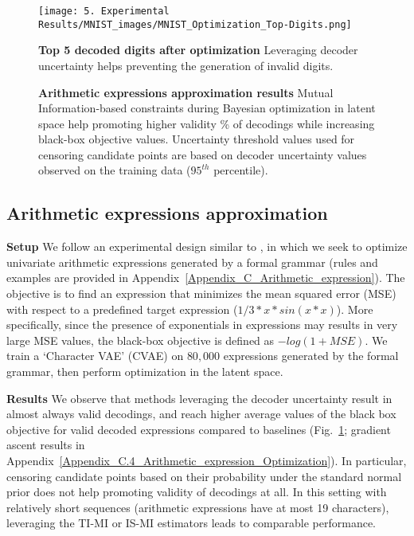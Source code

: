 \begin{figure}[ht]
\begin{minipage}[m]{0.48\linewidth}
\vspace{0pt}
\centering
    \texttt{[image: 5. Experimental Results/MNIST\_images/MNIST\_Optimization\_Top-Digits.png]}
    \caption{\textbf{Top 5 decoded digits after optimization} Leveraging decoder uncertainty helps preventing the generation of invalid digits.}
    \label{Sec5_Fig_MNIST_Top_images}
\end{minipage}
\hfill
\begin{minipage}[m]{0.48\linewidth}
\vspace{0pt}\raggedright
\centering
\resizebox{.98\textwidth}{!}{

}
\caption{\textbf{Arithmetic expressions approximation results} Mutual Information-based constraints during Bayesian optimization in latent space help promoting higher validity \% of decodings while increasing black-box objective values. Uncertainty threshold values used for censoring candidate points are based on decoder uncertainty values observed on the training data ($95^{th}$ percentile).}
\label{Sec5.2_Arithmetic_results}
\end{minipage}
\end{figure}

\subsection{Arithmetic expressions approximation}

\textbf{Setup} We follow an experimental design similar to \citet{kusner2017grammar}, in which we seek to optimize univariate arithmetic expressions generated by a formal grammar (rules and examples are provided in Appendix~\ref{Appendix_C_Arithmetic_expression}). The objective is to find an expression that minimizes the mean squared error (MSE) with respect to a predefined target expression ($1/3 * x * sin(x*x)$). More specifically, since the presence of exponentials in expressions may results in very large MSE values, the black-box objective is defined as $-log(1+MSE)$. We train a `Character VAE' (CVAE) \citep{kusner2017grammar} on $80,000$ expressions generated by the formal grammar, then perform optimization in the latent space.

\textbf{Results} We observe that methods leveraging the decoder uncertainty result in almost always valid decodings, and reach higher average values of the black box objective for valid decoded expressions compared to baselines (Fig.~\ref{Sec5.2_Arithmetic_results}; gradient ascent results in Appendix~\ref{Appendix_C.4_Arithmetic_expression_Optimization}). In particular, censoring candidate points based on their probability under the standard normal prior does not help promoting validity of decodings at all. In this setting with relatively short sequences (arithmetic expressions have at most 19 characters), leveraging the TI-MI or IS-MI estimators leads to comparable performance.

